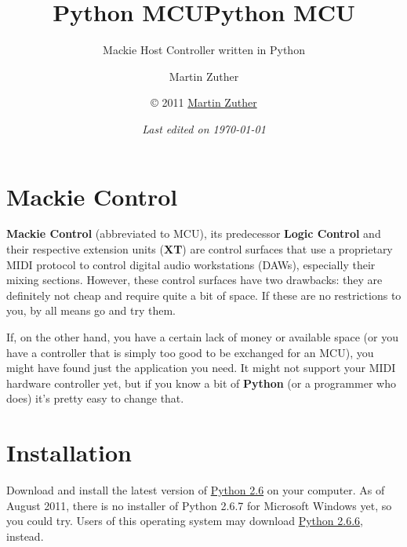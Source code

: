 


\title{Python MCU}
\author{Martin Zuther}



\title{Python MCU}

\subtitle{
  \normalsize{\textrm{\textmd{
        \vfill
        Mackie Host Controller written in Python
        \vfill
        \vspace{10em}
        \vfill
      }}}
}

\author{\normalsize\copyright{} 2011
  \href{http://www.mzuther.de/}{Martin Zuther}}

\date{\normalsize \emph{Last edited on \today}}

\maketitle

\tableofcontents

\clearpage  %

\chapter{Mackie Control}
\label{chap:mackie_control}

\textbf{Mackie Control} (abbreviated to MCU), its predecessor
\textbf{Logic Control} and their respective extension units
(\textbf{XT}) are control surfaces that use a proprietary MIDI
protocol to control digital audio workstations (DAWs), especially
their mixing sections.  However, these control surfaces have two
drawbacks: they are definitely not cheap and require quite a bit of
space.  If these are no restrictions to you, by all means go and try
them.

If, on the other hand, you have a certain lack of money or available
space (or you have a controller that is simply too good to be
exchanged for an MCU), you might have found just the application you
need.  It might not support your MIDI hardware controller yet, but if
you know a bit of \textbf{Python} (or a programmer who does) it's
pretty easy to change that.


\chapter{Installation}
\label{chap:python_mcu}

Download and install the latest version of
\href{http://www.python.org/}{Python 2.6} on your computer.  As of
August 2011, there is no installer of Python 2.6.7 for Microsoft
Windows yet, so you could try.  Users of this operating system may
download \href{http://www.python.org/download/releases/2.6.6/}{Python
  2.6.6}, instead.

